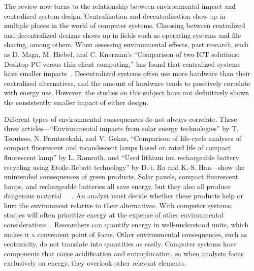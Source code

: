 \documentclass[final,journal,10pt,letterpaper,oneside,twocolumn,compsoc]%
{IEEEtran}
\begin{document}
The review now turns to the relationship between environmental impact and
centralized system design.
Centralization and decentralization show up in multiple places in the world of
computer systems. Choosing between centralized and decentralized designs shows
up in fields such as operating systems and file sharing, among others. When
assessing
environmental effects, past research, such as D. Maga, M. Hiebel, and C.
Knerman's ``Comparison of two ICT solutions: Desktop PC versus thin client
computing,'' has found that centralized systems have smaller impacts~\cite{maga}. 
Decentralized systems often use more hardware than their
centralized alternatives, and the amount of hardware tends to positively
correlate with energy use. However, the studies on this subject have not
definitively shown the consistently smaller impact of either design.

Different types of environmental consequences do not always correlate. These
three articles---``Environmental impacts from solar energy
technologies'' by T. Tsoutsos, N. Frantzeskaki, and V. Gekas,
``Comparison of life-cycle analyses
of compact fluorescent and incandescent lamps based on rated life of compact
fluorescent lamp'' by L. Ramroth, and ``Used lithium
ion rechargeable battery recycling using Etoile-Rebatt technology'' by D.-i. Ra
and K.-S. Han---show the unintended consequences of green products. Solar
panels, compact fluorescent lamps, and rechargeable batteries all save energy,
but they also all produce dangerous material~\cite{solar}~\cite{cfl}~\cite{battery}. An analyst must decide whether these products help or hurt the
environment relative to their alternatives. With computer systems, studies
will often prioritize energy at
the expense of other environmental considerations~\cite{maga}. Researchers can
quantify energy in well-understood units, which makes it a convenient point of
focus. Other environmental consequences, such
as ecotoxicity, do not translate into quantities as easily. Computer systems
have components that cause acidification and eutrophication,
so when analysts focus exclusively on energy, they overlook other relevant
elements.
\end{document}
